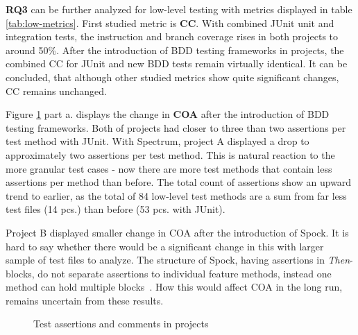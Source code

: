 \textbf{RQ3} can be further analyzed for low-level testing with metrics displayed in table \ref{tab:low-metrics}.
First studied metric is \textbf{CC}. With combined JUnit unit and integration tests, the instruction and branch coverage rises in both projects
to around 50\%. After the introduction of BDD testing frameworks in projects, the combined CC   \noindent for JUnit and new BDD tests remain
virtually identical. It can be concluded, that although other studied metrics show quite significant changes, CC remains
unchanged.

Figure \ref{fig:coa-coc} part a. displays the change in \textbf{COA} after the introduction of BDD testing frameworks. Both of projects had closer to three
than two assertions per test method with JUnit. With Spectrum, project A displayed a drop to approximately
two assertions
per test method. This is natural reaction to the more granular test cases - now there are more test methods that contain
less assertions per method than before. The total count of assertions show an upward trend to earlier, as the total of 84 low-level
test methods are a sum from far less test files (14 pcs.) than before (53 pcs. with JUnit).

Project B displayed smaller change in COA after the introduction of Spock. It is hard to say whether there would be a significant
change in this with larger sample of test files to analyze. The structure of Spock, having assertions in \textit{Then}-blocks,
do not separate assertions to individual feature methods, instead one method can hold multiple blocks~\cite{spock}. How
this would affect COA in the long run, remains uncertain from these results.

    \begin{figure}[H]%
        \centering
        \qquad
        \caption{Test assertions and comments in projects}%
        \label{fig:coa-coc}%
    \end{figure}

